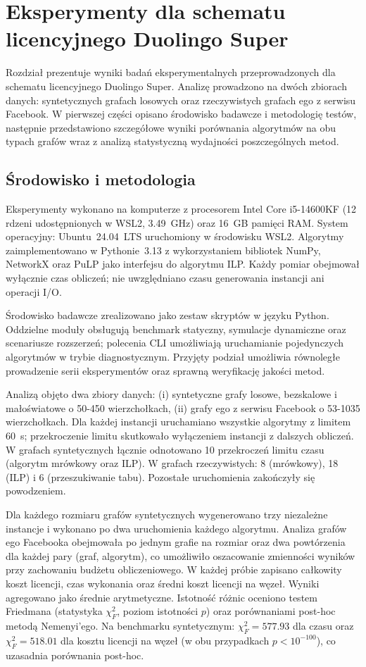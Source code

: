 \chapter{Eksperymenty dla schematu licencyjnego Duolingo Super}
\label{chap:experiments}

Rozdział prezentuje wyniki badań eksperymentalnych przeprowadzonych dla schematu licencyjnego Duolingo Super. Analizę prowadzono na dwóch zbiorach danych: syntetycznych grafach losowych oraz rzeczywistych grafach ego z serwisu Facebook. W pierwszej części opisano środowisko badawcze i metodologię testów, następnie przedstawiono szczegółowe wyniki porównania algorytmów na obu typach grafów wraz z analizą statystyczną wydajności poszczególnych metod.

\section{Środowisko i metodologia}

Eksperymenty wykonano na komputerze z procesorem Intel Core i5-14600KF (12 rdzeni udostępnionych w WSL2, 3.49~GHz) oraz 16~GB pamięci RAM. System operacyjny: Ubuntu~24.04~LTS uruchomiony w środowisku WSL2. Algorytmy zaimplementowano w Pythonie~3.13 z wykorzystaniem bibliotek NumPy, NetworkX oraz PuLP jako interfejsu do algorytmu ILP. Każdy pomiar obejmował wyłącznie czas obliczeń; nie uwzględniano czasu generowania instancji ani operacji I/O.

Środowisko badawcze zrealizowano jako zestaw skryptów w języku Python. Oddzielne moduły obsługują benchmark statyczny, symulacje dynamiczne oraz scenariusze rozszerzeń; polecenia CLI umożliwiają uruchamianie pojedynczych algorytmów w trybie diagnostycznym. Przyjęty podział umożliwia równoległe prowadzenie serii eksperymentów oraz sprawną weryfikację jakości metod.

Analizą objęto dwa zbiory danych: (i) syntetyczne grafy losowe, bezskalowe i małoświatowe o 50-450 wierzchołkach, (ii) grafy ego z serwisu Facebook o 53-1035 wierzchołkach. Dla każdej instancji uruchamiano wszystkie algorytmy z limitem 60~s; przekroczenie limitu skutkowało wyłączeniem instancji z dalszych obliczeń. W grafach syntetycznych łącznie odnotowano 10 przekroczeń limitu czasu (algorytm mrówkowy oraz ILP). W grafach rzeczywistych: 8 (mrówkowy), 18 (ILP) i 6 (przeszukiwanie tabu). Pozostałe uruchomienia zakończyły się powodzeniem.

Dla każdego rozmiaru grafów syntetycznych wygenerowano trzy niezależne instancje i wykonano po dwa uruchomienia każdego algorytmu. Analiza grafów ego Facebooka obejmowała po jednym grafie na rozmiar oraz dwa powtórzenia dla każdej pary (graf, algorytm), co umożliwiło oszacowanie zmienności wyników przy zachowaniu budżetu obliczeniowego. W każdej próbie zapisano całkowity koszt licencji, czas wykonania oraz średni koszt licencji na węzeł. Wyniki agregowano jako średnie arytmetyczne. Istotność różnic oceniono testem Friedmana (statystyka $\chi^2_F$, poziom istotności $p$) oraz porównaniami post-hoc metodą Nemenyi’ego. Na benchmarku syntetycznym: $\chi^2_F=577.93$ dla czasu oraz $\chi^2_F=518.01$ dla kosztu licencji na węzeł (w obu przypadkach $p<10^{-100}$), co uzasadnia porównania post-hoc.

